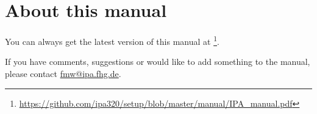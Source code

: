 \documentclass[12pt,twoside]{report}
\begin{document}

\thispagestyle{empty}\cleardoublepage %

\evensidemargin=2pt
\oddsidemargin=40pt

\renewcommand{\baselinestretch}{1.15}\normalsize



\tableofcontents
\thispagestyle{empty}\cleardoublepage

%

\chapter*{About this manual}
You can always get the latest version of this manual at \footnote{\url{https://github.com/ipa320/setup/blob/master/manual/IPA_manual.pdf}}.

If you have comments, suggestions or would like to add something to the manual, please contact \href{mailto:fmw@ipa.fhg.de}{fmw@ipa.fhg.de}.



\end{document}
